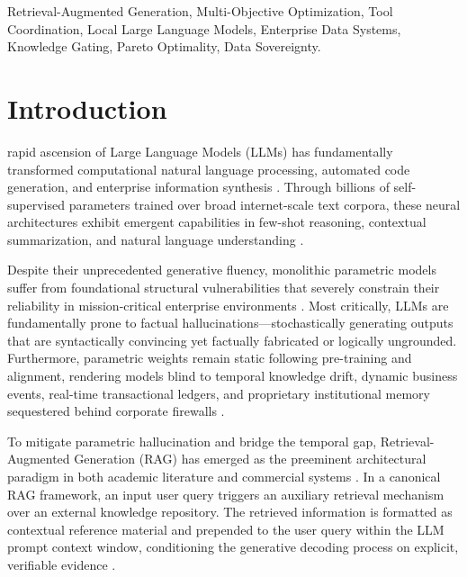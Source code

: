 \documentclass[journal,10pt,twocolumn]{IEEEtran}
\begin{document}
\begin{IEEEkeywords}
Retrieval-Augmented Generation, Multi-Objective Optimization, Tool Coordination, Local Large Language Models, Enterprise Data Systems, Knowledge Gating, Pareto Optimality, Data Sovereignty.
\end{IEEEkeywords}

\section{Introduction}
\label{sec:introduction}

 rapid ascension of Large Language Models (LLMs) has fundamentally transformed computational natural language processing, automated code generation, and enterprise information synthesis \cite{achiam2023gpt4,touvron2023llama,bai2023qwen}. Through billions of self-supervised parameters trained over broad internet-scale text corpora, these neural architectures exhibit emergent capabilities in few-shot reasoning, contextual summarization, and natural language understanding \cite{brown2020language,wei2022emergent}. 

Despite their unprecedented generative fluency, monolithic parametric models suffer from foundational structural vulnerabilities that severely constrain their reliability in mission-critical enterprise environments \cite{ji2023hallucination,huang2023survey}. Most critically, LLMs are fundamentally prone to factual hallucinations---stochastically generating outputs that are syntactically convincing yet factually fabricated or logically ungrounded. Furthermore, parametric weights remain static following pre-training and alignment, rendering models blind to temporal knowledge drift, dynamic business events, real-time transactional ledgers, and proprietary institutional memory sequestered behind corporate firewalls \cite{lewis2020rag,mialon2023augmented}.

To mitigate parametric hallucination and bridge the temporal gap, Retrieval-Augmented Generation (RAG) has emerged as the preeminent architectural paradigm in both academic literature and commercial systems \cite{lewis2020rag,guu2020realm,borgeaud2022retro}. In a canonical RAG framework, an input user query triggers an auxiliary retrieval mechanism over an external knowledge repository. The retrieved information is formatted as contextual reference material and prepended to the user query within the LLM prompt context window, conditioning the generative decoding process on explicit, verifiable evidence \cite{gao2023rag_survey}.
\end{document}
